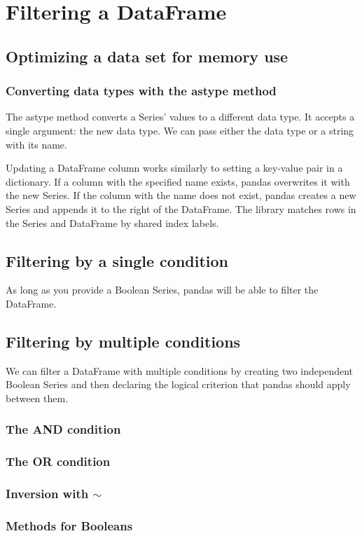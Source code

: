 \chapter{Filtering a DataFrame\label{Ch05}}
\section{Optimizing a data set for memory use}
\subsection{Converting data types with the astype method}
The astype method converts a Series’ values to a different data type. It accepts a single argument: the new data type. We can pass either the data type or a string with its name.

Updating a DataFrame column works similarly to setting a key-value pair in a dictionary. If a column with the specified name exists, pandas overwrites it with the new Series. If the column with the name does not exist, pandas creates a new Series and appends it to the right of the DataFrame. The library matches rows in the Series and DataFrame by shared index labels.
\section{Filtering by a single condition}
As long as you provide a Boolean Series, pandas will be able to filter the DataFrame.
\section{Filtering by multiple conditions}
We can filter a DataFrame with multiple conditions by creating two independent Boolean Series and then declaring the logical criterion that pandas should apply between them.
\subsection{The AND condition}
\subsection{The OR condition}
\subsection{Inversion with $\sim$}
\subsection{Methods for Booleans}

